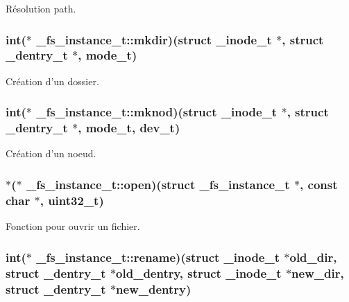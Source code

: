 \-Résolution path. \hypertarget{struct__fs__instance__t_a705d100026840b619f217931dc8419f3}{
\subsubsection[{mkdir}]{\setlength{\rightskip}{0pt plus 5cm}int($\ast$ {\bf \-\_\-fs\-\_\-instance\-\_\-t\-::mkdir})(struct {\bf \-\_\-inode\-\_\-t} $\ast$, struct {\bf \-\_\-dentry\-\_\-t} $\ast$, {\bf mode\-\_\-t})}}\label{struct__fs__instance__t_a705d100026840b619f217931dc8419f3}
\-Création d'un dossier. \hypertarget{struct__fs__instance__t_ae57436a3bfd6de530204a67a8ac2f4f0}{
\subsubsection[{mknod}]{\setlength{\rightskip}{0pt plus 5cm}int($\ast$ {\bf \-\_\-fs\-\_\-instance\-\_\-t\-::mknod})(struct {\bf \-\_\-inode\-\_\-t} $\ast$, struct {\bf \-\_\-dentry\-\_\-t} $\ast$, {\bf mode\-\_\-t}, {\bf dev\-\_\-t})}}\label{struct__fs__instance__t_ae57436a3bfd6de530204a67a8ac2f4f0}
\-Création d'un noeud. \hypertarget{struct__fs__instance__t_a693ff16b5d2119c50abd40a59f62cd66}{
\subsubsection[{open}]{$\ast$($\ast$ {\bf \-\_\-fs\-\_\-instance\-\_\-t\-::open})(struct {\bf \-\_\-fs\-\_\-instance\-\_\-t} $\ast$, const char $\ast$, {\bf uint32\-\_\-t})}}\label{struct__fs__instance__t_a693ff16b5d2119c50abd40a59f62cd66}
\-Fonction pour ouvrir un fichier. \hypertarget{struct__fs__instance__t_a62e37513c47dda9d11e534cf84d6f48b}{
\subsubsection[{rename}]{\setlength{\rightskip}{0pt plus 5cm}int($\ast$ {\bf \-\_\-fs\-\_\-instance\-\_\-t\-::rename})(struct {\bf \-\_\-inode\-\_\-t} $\ast$old\-\_\-dir, struct {\bf \-\_\-dentry\-\_\-t} $\ast$old\-\_\-dentry, struct {\bf \-\_\-inode\-\_\-t} $\ast$new\-\_\-dir, struct {\bf \-\_\-dentry\-\_\-t} $\ast$new\-\_\-dentry)}}\label{struct__fs__instance__t_a62e37513c47dda9d11e534cf84d6f48b}
